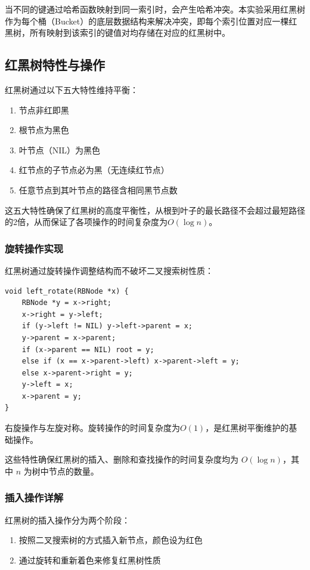 \documentclass[12pt,a4paper]{article}
\begin{document}
当不同的键通过哈希函数映射到同一索引时，会产生哈希冲突。本实验采用红黑树作为每个桶（Bucket）的底层数据结构来解决冲突，即每个索引位置对应一棵红黑树，所有映射到该索引的键值对均存储在对应的红黑树中。

\subsection{红黑树特性与操作}
红黑树通过以下五大特性维持平衡：
\begin{enumerate}
    \item 节点非红即黑
    \item 根节点为黑色
    \item 叶节点（NIL）为黑色
    \item 红节点的子节点必为黑（无连续红节点）
    \item 任意节点到其叶节点的路径含相同黑节点数
\end{enumerate}

这五大特性确保了红黑树的高度平衡性，从根到叶子的最长路径不会超过最短路径的2倍，从而保证了各项操作的时间复杂度为$O(\log n)$。

\subsubsection{旋转操作实现}
红黑树通过旋转操作调整结构而不破坏二叉搜索树性质：

\begin{lstlisting}[caption=左旋操作实现]
void left_rotate(RBNode *x) {
    RBNode *y = x->right;
    x->right = y->left;
    if (y->left != NIL) y->left->parent = x;
    y->parent = x->parent;
    if (x->parent == NIL) root = y;
    else if (x == x->parent->left) x->parent->left = y;
    else x->parent->right = y;
    y->left = x;
    x->parent = y;
}
\end{lstlisting}

右旋操作与左旋对称。旋转操作的时间复杂度为$O(1)$，是红黑树平衡维护的基础操作。

这些特性确保红黑树的插入、删除和查找操作的时间复杂度均为 \(O(\log n)\)，其中 \(n\) 为树中节点的数量。

\subsubsection{插入操作详解}
红黑树的插入操作分为两个阶段：
\begin{enumerate}
\item 按照二叉搜索树的方式插入新节点，颜色设为红色
\item 通过旋转和重新着色来修复红黑树性质
\end{enumerate}
\end{document}
